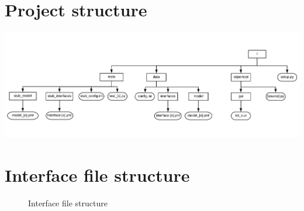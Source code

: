 \documentclass{article}
\begin{document}
\section{Project structure}\label{sec:appendix-proj-struct}

\begin{center}
	\begin{sideways}%
		\begin{minipage}{0.92\textheight}
			\includegraphics[width=\linewidth,keepaspectratio]{project_layout}
			\label{fig:xx}
		\end{minipage}
	\end{sideways}
\end{center}

\section{Interface file structure} \label{sec:appendix-interface-struct}
\begin{figure}[!htb]
	\caption{\label{fig:interface-struct} Interface file structure}
\end{figure}
\end{document}
